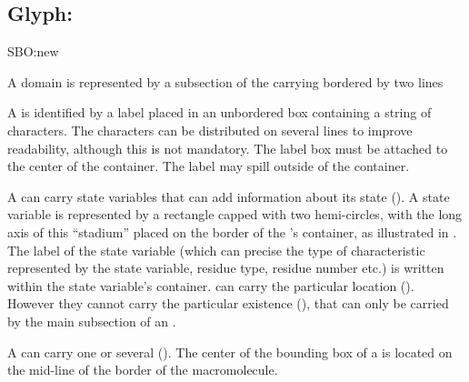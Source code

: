 \color{red}

\subsection{Glyph: }
\label{sec:domain}

\begin{glyphDescription}

\glyphSboTerm SBO:new

\glyphContainer A domain is represented by a subsection of the carrying  bordered by two lines 

\glyphLabel A  is identified by a label placed in an unbordered box containing a string of characters.  The characters can be distributed on several lines to improve readability, although this is not mandatory.  The label box must be attached to the center of the container.  The label may spill outside of the container.

\glyphAux A  can carry state variables that can add information about its state ().  A state variable is represented by a rectangle capped with two hemi-circles, with the long axis of this  ``stadium'' placed on the border of the 's container, as illustrated in .  The label of the state variable (which can precise the type of characteristic represented by the state variable, residue type, residue number etc.) is written within the state variable's container.  can carry the particular  location (). However they cannot carry the particular  existence (), that can only be carried by the main subsection of an .

A  can carry one or several  (). The center of the bounding box of a  is located on the mid-line of the border of the macromolecule.

\end{glyphDescription}
